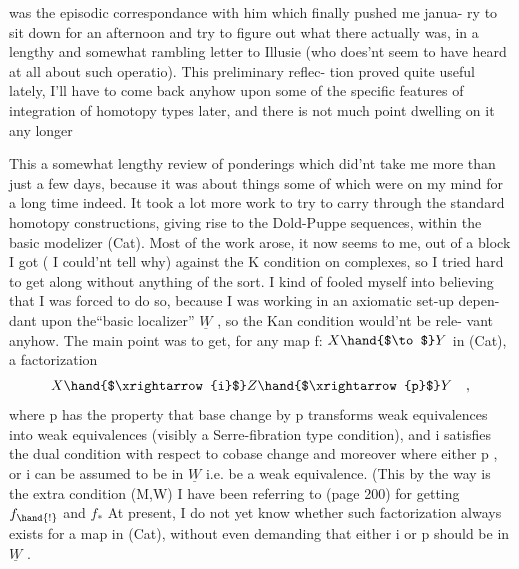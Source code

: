 was the episodic correspondance with him which finally pushed me   janua-%
ry to sit down for an afternoon and try to figure out what there actually
was, in a lengthy and somewhat rambling letter to Illusie (who does'nt
seem to have heard at all about such operatio). This preliminary reflec-%
tion proved quite useful lately, I'll have to come back anyhow upon some
of the specific features of integration of homotopy types later, and there
is not much point dwelling on it any longer  

 This  a \hand{(} somewhat lengthy\hand{!)} review of ponderings which did'nt take me
more than just a few days, because it was about things some of which were
on my mind for a long time indeed. It took  a lot more work to try to
carry through the standard homotopy constructions, giving rise to the
Dold-Puppe sequences, within the basic modelizer (Cat). Most of the work
arose, it now seems to me, out of a block I got ( I could'nt tell why)
against the K condition on complexes, so I tried hard to get along
without anything of the sort. I kind of fooled myself into believing that
I was forced to do so, because I was working in an axiomatic set-up depen-%
dant upon the``basic localizer'' $\underline{W}$ , so the Kan condition would'nt be rele-%
vant anyhow. The main point was to get, for any map f: $X \hand{$\to$} Y$ in (Cat),
a factorization
\[ X \hand{$\xrightarrow{i}$} Z \hand{$\xrightarrow{p}$} Y \quad , \]
where p has the property that base change by p transforms weak equivalences
into weak equivalences\hand{,}  (visibly a Serre-fibration type condition),
and i satisfies the dual condition with respect to co\unsure{-}base change\hand{;} and
moreover where either p , or i can be assumed to be in $\underline{W}$ i.e.  be a weak
equivalence. (This\hand{,} by the way\hand{,} is the extra condition  (M,W) I
have been referring to   (page 200)\deleted{\unsure{)}}\hand{,} for  getting $f_{\hand{!}}$ and $f_{*}$ 
At present, I do not yet know whether such factorization  always
exists for a map in (Cat), without even  demanding that either i
or p should be in $\underline{W}$ . \hand{$\Vert$}

